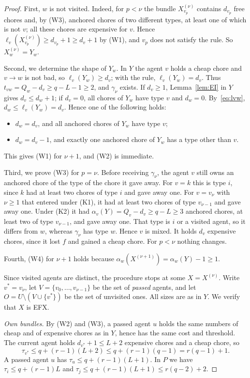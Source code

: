 \documentclass{amsart}
\numberwithin{equation}{section}
\theoremstyle{definition}
\theoremstyle{remark}
\begin{document}
\begin{proof}
First, $w$ is not visited. Indeed, for $p<\nu$ the bundle $X^{(\nu)}_{v_p}$ contains $d_{v_p}$ free chores and, by (W3), anchored chores of two different types, at least one of which is not $v$; all these chores are expensive for $v$. Hence $\ell_v(X^{(\nu)}_{v_p})\ge d_{v_p}+1\ge d_v+1$ by (W1), and $v_p$ does not satisfy the rule. So $X^{(\nu)}_w=Y_w$.

Second, we determine the shape of $Y_w$. In $Y$ the agent $v$ holds a cheap chore and $v\to w$ is not bad, so $\ell_v(Y_w)\ge d_v$; with the rule, $\ell_v(Y_w)=d_v$. Thus $t_{vw}=Q_w-d_v\ge q-L-1\ge2$, and $\gamma_\nu$ exists. If $d_v\ge1$, Lemma~\ref{lem:EI} in $Y$ gives $d_v\le d_w+1$; if $d_v=0$, all chores of $Y_w$ have type $v$ and $d_w=0$. By~\eqref{eq:lvw}, $d_w\le\ell_v(Y_w)=d_v$. Hence one of the following holds:
\begin{itemize}
\item[(K1)] $d_w=d_v$, and all anchored chores of $Y_w$ have type $v$;
\item[(K2)] $d_w=d_v-1$, and exactly one anchored chore of $Y_w$ has a type other than $v$.
\end{itemize}
This gives (W1) for $\nu+1$, and (W2) is immediate.

Third, we prove (W3) for $p=\nu$. Before receiving $\gamma_\nu$, the agent $v$ still owns an anchored chore of the type of the chore it gave away. For $v=k$ this is type $i$, since $k$ had at least two chores of type $i$ and gave away one. For $v=v_\nu$ with $\nu\ge1$ that entered under (K1), it had at least two chores of type $v_{\nu-1}$ and gave away one. Under (K2) it had $\alpha_v(Y)=Q_v-d_v\ge q-L\ge3$ anchored chores, at least two of type $v_{\nu-1}$, and gave away one. That type is $i$ or a visited agent, so it differs from $w$, whereas $\gamma_\nu$ has type $w$. Hence $v$ is mixed. It holds $d_v$ expensive chores, since it lost $f$ and gained a cheap chore. For $p<\nu$ nothing changes.

Fourth, (W4) for $\nu+1$ holds because $\alpha_w(X^{(\nu+1)})=\alpha_w(Y)-1\ge1$.

Since visited agents are distinct, the procedure stops at some $X=X^{(\nu)}$. Write $v^*=v_\nu$, let $V=\{v_0,\dots,v_{\nu-1}\}$ be the set of \emph{passed} agents, and let $O=U\setminus(V\cup\{v^*\})$ be the set of unvisited ones. All sizes are as in $Y$. We verify that $X$ is EFX.

\emph{Own bundles.} By (W2) and (W3), a passed agent $u$ holds the same numbers of cheap and of expensive chores as in $Y$, hence has the same cost and threshold. The current agent holds $d_{v^*}+1\le L+2$ expensive chores and a cheap chore, so
\[
\tau_{v^*}\le q+(r-1)(L+2)\le q+(r-1)(q-1)=r(q-1)+1 .
\]
A passed agent $u$ has $\tau_u\le q+(r-1)(L+1)$. In $P$ we have $\tau_i\le q+(r-1)L$ and $\tau_j\le q+(r-1)(L+1)\le r(q-2)+2$.


\end{proof}
\end{document}
